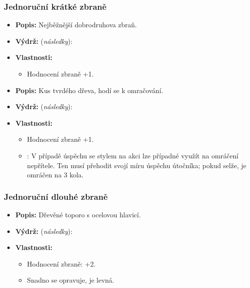 \documentclass[../main.tex]{subfiles}
\begin{document}
\subsubsection{Jednoruční krátké zbraně}
\label{sec:zbrane_jedna}

\begin{predmet}[Dýka]
\begin{itemize}
	\item \textbf{Popis:} Nejběžnější dobrodruhova zbraň.
	\item \textbf{Výdrž:} (\emph{následky}): 
	\item \textbf{Vlastnosti:}
		\begin{itemize}
			\item Hodnocení zbraně +1. 
		\end{itemize}
\end{itemize}
\end{predmet}

\begin{predmet}[Obušek]
\begin{itemize}
	\item \textbf{Popis:} Kus tvrdého dřeva, hodí se k omračování.
	\item \textbf{Výdrž:} (\emph{následky}):  
	\item \textbf{Vlastnosti:}
		\begin{itemize}
			\item Hodnocení zbraně +1. 
			\item {}: V případě úspěchu se stylem na akci  lze případné  využít na omráčení nepřítele. Ten musí přehodit svojí  míru úspěchu útočníka; pokud selže, je omráčen na 3 kola.
		\end{itemize}
\end{itemize}
\end{predmet}

\subsubsection{Jednoruční dlouhé zbraně}
\label{sec:zbrane_dva}

\begin{predmet}[Sekera]
\begin{itemize}
	\item \textbf{Popis:} Dřevěné toporo s ocelovou hlavicí.
	\item \textbf{Výdrž:} (\emph{následky}): 
	\item \textbf{Vlastnosti:}
		\begin{itemize}
			\item Hodnocení zbraně: +2.
			\item Snadno se opravuje, je levná.
		\end{itemize}
\end{itemize}
\end{predmet}
\end{document}
